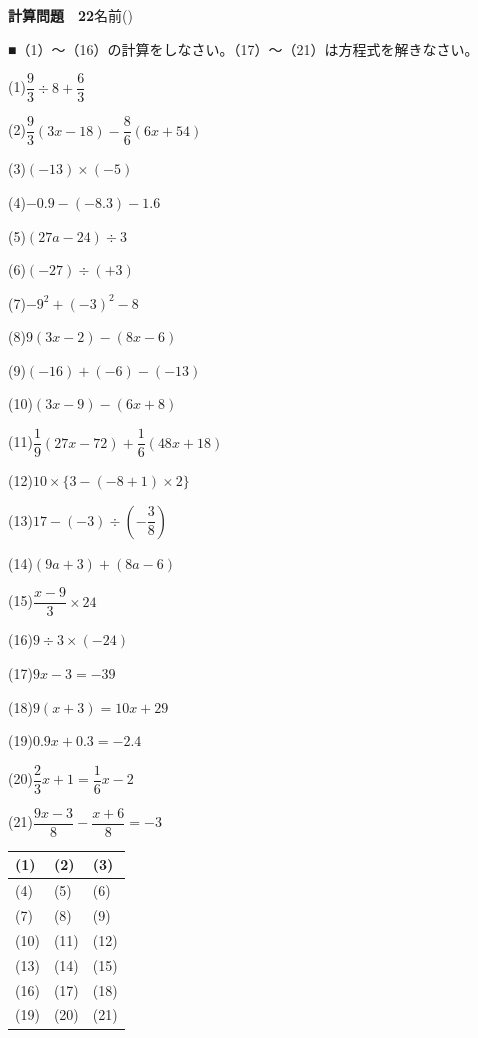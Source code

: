 \documentclass[a4paper,11pt]{ltjsarticle}
\newlength{\qcol}\setlength{\qcol}{0.47\textwidth}
\newlength{\qgap}
\newlength{\anscolw}\setlength{\anscolw}{0.30\textwidth}
\newlength{\ansh}
\newcommand{\Q}[2]{\parbox[t]{\qcol}{\raggedright (#1)\hspace{0.6em}$\displaystyle #2$}}
\newcommand{\QR}[4]{\Q{#1}{#2}\hfill\Q{#3}{#4}\par\vspace{\qgap}}
\newcommand{\anscell}[1]{\rule[-\ansdrop]{0pt}{\ansh}(#1)}
\newlength{\ansdrop}
\begin{document}
{\large\bfseries 計算問題　22}\hfill 名前(\underline{\hspace{32mm}})\par\vspace{3mm}
■（1）〜（16）の計算をしなさい。（17）〜（21）は方程式を解きなさい。\par\vspace{3mm}
\setlength{\qgap}{5.4mm}
\QR{1}{\dfrac{9}{3}\div8+\dfrac{6}{3}}{2}{\dfrac{9}{3}(3x-18)-\dfrac{8}{6}(6x+54)}
\QR{3}{(-13)\times(-5)}{4}{-0.9-(-8.3)-1.6}
\QR{5}{(27a-24)\div3}{6}{(-27)\div(+3)}
\QR{7}{-9^2+(-3)^2-8}{8}{9(3x-2)-(8x-6)}
\QR{9}{(-16)+(-6)-(-13)}{10}{(3x-9)-(6x+8)}
\QR{11}{\dfrac{1}{9}(27x-72)+\dfrac{1}{6}(48x+18)}{12}{10\times\{3-(-8+1)\times2\}}
\QR{13}{17-(-3)\div\left(-\dfrac{3}{8}\right)}{14}{(9a+3)+(8a-6)}
\QR{15}{\dfrac{x-9}{3}\times24}{16}{9\div3\times(-24)}
\QR{17}{9x-3=-39}{18}{9(x+3)=10x+29}
\QR{19}{0.9x+0.3=-2.4}{20}{\dfrac{2}{3}x+1=\dfrac{1}{6}x-2}
\vspace{1mm}
\Q{21}{\dfrac{9x-3}{8}-\dfrac{x+6}{8}=-3}\par\vspace{3mm}
\setlength{\ansh}{9.5mm}\setlength{\ansdrop}{6mm}%
\begin{center}\begin{tabular}{|p{\anscolw}|p{\anscolw}|p{\anscolw}|}\hline
\anscell{1} & \anscell{2} & \anscell{3} \\\hline
\anscell{4} & \anscell{5} & \anscell{6} \\\hline
\anscell{7} & \anscell{8} & \anscell{9} \\\hline
\anscell{10} & \anscell{11} & \anscell{12} \\\hline
\anscell{13} & \anscell{14} & \anscell{15} \\\hline
\anscell{16} & \anscell{17} & \anscell{18} \\\hline
\anscell{19} & \anscell{20} & \anscell{21} \\\hline
\end{tabular}\end{center}
\end{document}
